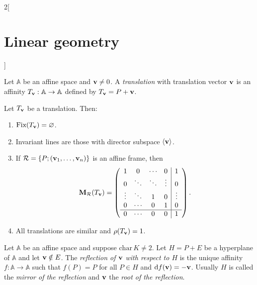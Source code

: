 \documentclass[../../../main.tex]{subfiles}
\begin{document}
\begin{multicols}{2}[\section{Linear geometry}]
\begin{definition}
    \end{definition}
    \begin{definition}[Translations]
        Let $\mathbb{A}$ be an affine space and $\boldsymbol{\mathrm{v}}\ne 0$. A \textit{translation} with translation vector $\boldsymbol{\mathrm{v}}$ is an affinity $T_{\boldsymbol{\mathrm{v}}}:\mathbb{A}\rightarrow\mathbb{A}$ defined by $T_{\boldsymbol{\mathrm{v}}}=P+\boldsymbol{\mathrm{v}}$.
    \end{definition}
    \begin{prop}
        Let $T_{\boldsymbol{\mathrm{v}}}$ be a translation. Then:
        \begin{enumerate}
            \item $\text{Fix}(T_{\boldsymbol{\mathrm{v}}})=\varnothing$.
            \item Invariant lines are those with director subspace $\langle\boldsymbol{\mathrm{v}}\rangle$.
            \item If $\mathcal{R}=\{P;(\boldsymbol{\mathrm{v}}_1,\ldots,\boldsymbol{\mathrm{v}}_n)\}$ is an affine frame, then $$\boldsymbol{\mathrm{M}}_\mathcal{R}(T_{\boldsymbol{\mathrm{v}}})=\left(\begin{array}{cccc|c}
                              1      & 0      & \cdots & 0      & 1      \\
                              0      & \ddots & \ddots & \vdots & 0      \\
                              \vdots & \ddots & 1      & 0      & \vdots \\
                              0      & \cdots & 0      & 1      & 0      \\
                              \hline
                              0      & \cdots & 0      & 0      & 1
                          \end{array}\right).$$
            \item All translations are similar and $\rho(T_{\boldsymbol{\mathrm{v}}})=1$.
        \end{enumerate}
    \end{prop}
    \begin{definition}[Reflections]
        Let $\mathbb{A}$ be an affine space and suppose $\text{char}\,K\ne 2$. Let $H=P+E$ be a hyperplane of $\mathbb{A}$ and let $\boldsymbol{\mathrm{v}}\notin E$. The \textit{reflection of $\boldsymbol{\mathrm{v}}$ with respect to $H$} is the unique affinity $f:\mathbb{A}\rightarrow\mathbb{A}$ such that $f(P)=P$ for all $P\in H$ and $\dd f(\boldsymbol{\mathrm{v}})=-\boldsymbol{\mathrm{v}}$. Usually $H$ is called the \textit{mirror of the reflection} and $\boldsymbol{\mathrm{v}}$ the \textit{root of the reflection}.

\end{definition}
\end{multicols}
\end{document}
